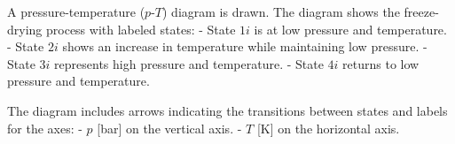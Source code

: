 A pressure-temperature (\( p \)-\( T \)) diagram is drawn. The diagram shows the freeze-drying process with labeled states:  
- State \( 1i \) is at low pressure and temperature.  
- State \( 2i \) shows an increase in temperature while maintaining low pressure.  
- State \( 3i \) represents high pressure and temperature.  
- State \( 4i \) returns to low pressure and temperature.  

The diagram includes arrows indicating the transitions between states and labels for the axes:  
- \( p \) [bar] on the vertical axis.  
- \( T \) [K] on the horizontal axis.